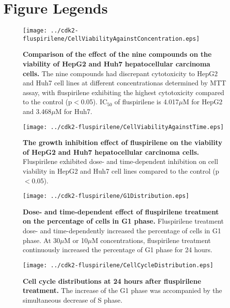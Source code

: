 \documentclass[10pt]{article}
\begin{document}
\section*{Figure Legends}

\begin{figure}
\begin{center}
\texttt{[image: ../cdk2-fluspirilene/CellViabilityAgainstConcentration.eps]}
\end{center}
\caption{
{\bf Comparison of the effect of the nine compounds on the viability of HepG2 and Huh7 hepatocellular carcinoma cells.} The nine compounds had discrepant cytotoxicity to HepG2 and Huh7 cell lines at different concentrationas determined by MTT assay, with fluspirilene exhibiting the highest cytotoxicity compared to the control (p$<$0.05). IC$_{50}$ of fluspirilene is 4.017$\mu$M for HepG2 and 3.468$\mu$M for Huh7.
}
\label{CellViabilityAgainstConcentration}
\end{figure}

\begin{figure}
\begin{center}
\texttt{[image: ../cdk2-fluspirilene/CellViabilityAgainstTime.eps]}
\end{center}
\caption{
{\bf The growth inhibition effect of fluspirilene on the viability of HepG2 and Huh7 hepatocellular carcinoma cells.} Fluspirilene exhibited dose- and time-dependent inhibition on cell viability in HepG2 and Huh7 cell lines compared to the control (p$<$0.05).
}
\label{CellViabilityAgainstTime}
\end{figure}

\begin{figure}
\begin{center}
\texttt{[image: ../cdk2-fluspirilene/G1Distribution.eps]}
\end{center}
\caption{
{\bf Dose- and time-dependent effect of fluspirilene treatment on the percentage of cells in G1 phase.} Fluspirilene treatment dose- and time-dependently increased the percentage of cells in G1 phase. At 30$\mu$M or 10$\mu$M concentrations, fluspirilene treatment continuously increased the percentage of G1 phase for 24 hours.
}
\label{G1Distribution}
\end{figure}

\begin{figure}
\begin{center}
\texttt{[image: ../cdk2-fluspirilene/CellCycleDistribution.eps]}
\end{center}
\caption{
{\bf Cell cycle distributions at 24 hours after fluspirilene treatment.} The increase of the G1 phase was accompanied by the simultaneous decrease of S phase.
}
\label{CellCycleDistribution}
\end{figure}
\end{document}
